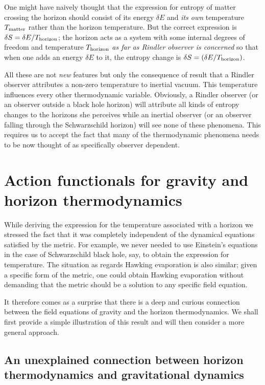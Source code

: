 \documentclass[12pt]{iopart}
\begin{document}
One might  have naively thought that the expression for entropy of matter
crossing the horizon 
should consist of its energy $\delta E$ and \textit{its own} temperature $T_{\rm matter}$
rather than the horizon temperature. 
But the correct expression is $\delta S = \delta E/T_{\rm horizon}$;
  the  horizon acts as a system with some internal degrees of freedom and temperature $T_{\rm horizon}$ \textit{as far as Rindler observer is concerned} so that when one adds an energy $\delta E$ to it, the entropy change is $\delta S = (\delta E/ T_{\rm horizon})$.

  
  
All these are not \textit{new} features but only the consequence of 
result that 
a Rindler observer attributes a non-zero temperature to inertial vacuum. This temperature influences every other thermodynamic variable. 
Obviously, a  Rindler
observer (or an observer outside a black hole horizon) will attribute all kinds of  entropy changes to the horizons she perceives while an inertial observer
(or an observer falling through the Schwarzschild horizon) will see none of these phenomena.
This requires us  to accept the fact that  many of the thermodynamic phenomena needs to be now thought of as specifically observer dependent. 



\section{Action functionals for gravity and horizon thermodynamics}

While deriving the expression for the temperature associated with a horizon we stressed the fact that it was completely independent of the dynamical equations satisfied by the metric. For example, we never needed to use Einstein's equations in the case of Schwarzschild black hole, say,  to obtain the expression for temperature. The situation as regards Hawking evaporation is also similar; given a specific form of the  metric, one could obtain Hawking evaporation without demanding that the metric should be a solution to any specific field equation. 

It therefore comes as a surprise that there is a deep and curious connection 
between the field equations of gravity and the horizon thermodynamics. We shall first provide a simple illustration of this result and will then consider a more general approach.


\subsection{An unexplained connection between horizon thermodynamics and gravitational dynamics}\label{sec:connection}
\end{document}
